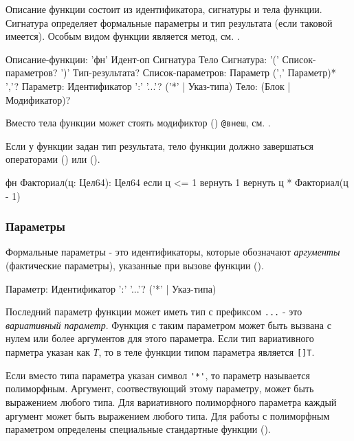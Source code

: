 Описание функции состоит из идентификатора, сигнатуры  и тела функции. 
Сигнатура определяет формальные параметры и тип результата (если таковой имеется). 
Особым видом функции является метод, см. .

\begin{Grammar}
Описание-функции: 'фн' Идент-оп Сигнатура Тело
Сигнатура: '(' Список-параметров? ')' Тип-результата?
Список-параметров: Параметр (',' Параметр)* ','?
Параметр: Идентификатор ':' '...'? ('*' | Указ-типа)  
Тело: (Блок | Модификатор)?
\end{Grammar} 

Вместо тела функции может стоять модификтор () \verb|@внеш|, см. .

Если у функции задан тип результата, тело функции должно завершаться операторами  () или  ().

\begin{Trivil}
фн Факториал(ц: Цел64): Цел64 {
    если ц <= 1 { вернуть 1 }
    вернуть ц * Факториал(ц - 1)
}
\end{Trivil}

\hypertarget{params}{%
\subsubsection{Параметры}\label{decls:params}}

Формальные параметры - это идентификаторы, которые обозначают \emph{аргументы} (фактические параметры), указанные при вызове функции ().

\begin{Grammar}
Параметр: Идентификатор ':' '...'? ('*' | Указ-типа)  
\end{Grammar} 

Последний параметр функции может иметь тип с префиксом \verb|...| - это \emph{вариативный параметр}. Функция с таким параметром может быть вызвана с нулем или более аргументов для этого параметра. Если тип вариативного парметра указан как \emph{Т}, то в теле функции типом  параметра является \verb+[]T+.

Если вместо типа параметра указан символ \verb|'*'|, то параметр называется полиморфным.
Аргумент, соотвествующий этому параметру, может быть выражением любого типа. 
Для вариативного полиморфного параметра каждый аргумент может быть выражением любого типа. 
Для работы с полиморфным параметром определены специальные стандартные функции ().

